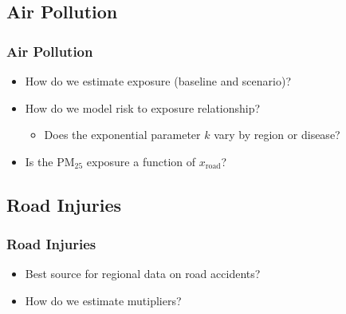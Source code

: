 \documentclass[handout,13pt,compress,c]{beamer}
\newcommand{\bi}{\begin{itemize}}
\newcommand{\ei}{\end{itemize}}
\begin{document}
\subsection{Air Pollution}
\begin{frame}[fragile]
\frametitle{Air Pollution}
\bi\item How do we estimate exposure (baseline and scenario)?
\item How do we model risk to exposure relationship?
\bi\item Does the exponential parameter $k$ vary by region or
disease?\ei
\item Is the $\mathrm{PM}_{25}$ exposure a function of $x_{\mathrm{road}}$?
\ei
\end{frame}
\subsection{Road Injuries}
\begin{frame}[fragile]
\frametitle{Road Injuries}
\bi\item Best source for regional data on road accidents? 
\item How do we estimate mutipliers?\ei
\end{frame}
\end{document}

